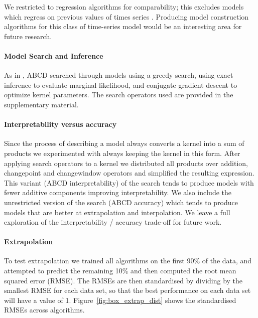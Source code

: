 \documentclass[letterpaper]{article}
\newcommand{\procedurename}{ABCD}
\begin{document}
We restricted to regression algorithms for comparability; this excludes models which regress on previous values of times series \citep[e.g.][]{box2013time}.
Producing model construction algorithms for this class of time-series model would be an interesting area for future research.

\paragraph{Model Search and Inference}

As in \citep{DuvLloGroetal13}, \procedurename{} searched through models using a greedy search, using exact \gp{} inference to evaluate marginal likelihood, and conjugate gradient descent to optimize kernel parameters.
The search operators used are provided in the supplementary material.

\paragraph{Interpretability versus accuracy}

Since the process of describing a model always converts a kernel into a sum of products we experimented with always keeping the kernel in this form.
After applying search operators to a kernel we distributed all products over addition, changepoint and changewindow operators and simplified the resulting expression.
This variant (\procedurename{} interpretability) of the search tends to produce models with fewer additive components improving interpretability.
We also include the unrestricted version of the search (\procedurename{} accuracy) which tends to produce models that are better at extrapolation and interpolation.
%
We leave a full exploration of the interpretability / accuracy trade-off for future work.

\paragraph{Extrapolation}

To test extrapolation we trained all algorithms on the first 90\% of the data, and attempted to predict the remaining 10\% and then computed the root mean squared error (RMSE).
The RMSEs are then standardised by dividing by the smallest RMSE for each data set, so that the best performance on each data set will have a value of 1.
%
Figure~\ref{fig:box_extrap_dist} shows the standardised RMSEs across algorithms.
\end{document}
